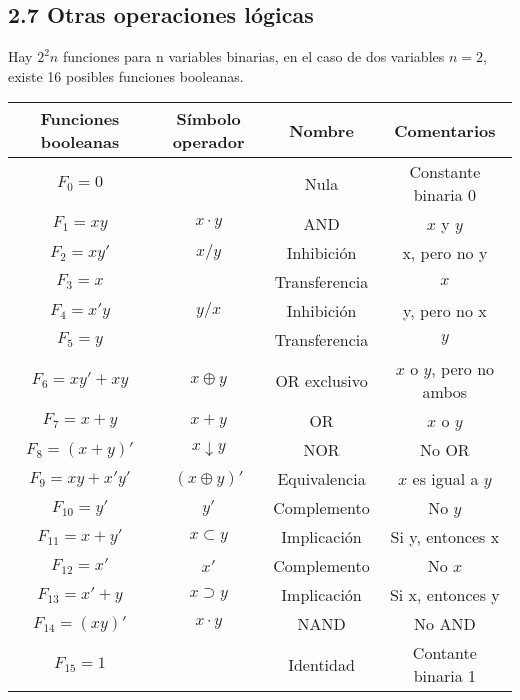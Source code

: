 \documentclass{article}
\begin{document}
\subsection*{2.7 Otras operaciones l\'{o}gicas}
Hay $2^2n$ funciones para n variables binarias, en el caso de dos variables $n = 2$, existe 16 posibles funciones booleanas.

\begin{table}[h]
    \centering
    \begin{tabular}{cccc}
        \toprule
        Funciones booleanas & S\'{i}mbolo operador & Nombre & Comentarios \\ 
        \midrule
        $F_0 = 0$ & & Nula & Constante binaria 0 \\
        $F_1 = xy$ & $x \cdot y$ & AND &$x$ y $y$ \\ 
        $F_2 = xy'$ & $x/y$ & Inhibici\'{o}n & x, pero no y \\
        $F_3 = x$ & & Transferencia & $x$ \\
        $F_4 = x'y$ & $y/x$ & Inhibici\'{o}n & y, pero no x \\
        $F_5 = y$ & & Transferencia & $y$ \\
        $F_6 = xy' + xy$ & $x \oplus y$ & OR exclusivo & $x$ o $y$, pero no ambos \\
        $F_7 = x + y$ & $x + y$ & OR & $x$ o $y$ \\
        $F_8 = (x + y)'$ & $x \downarrow y$ & NOR & No OR \\
        $F_9 = xy + x'y'$ & $(x \oplus y)'$ & Equivalencia & $x$ es igual a $y$ \\
        $F_{10} = y'$ & $y'$ & Complemento & No $y$ \\
        $F_{11} = x + y'$ & $x \subset y$ & Implicaci\'{o}n & Si y, entonces x \\
        $F_{12} = x'$ & $x'$ & Complemento & No $x$ \\
        $F_{13} = x' + y$ & $x \supset y$ & Implicaci\'{o}n & Si x, entonces y \\
        $F_{14} = (xy)'$ & $x \cdot y$ & NAND & No AND \\
        $F_{15} = 1$ & & Identidad & Contante binaria 1 \\
        \bottomrule
    \end{tabular}
\end{table}
\end{document}

